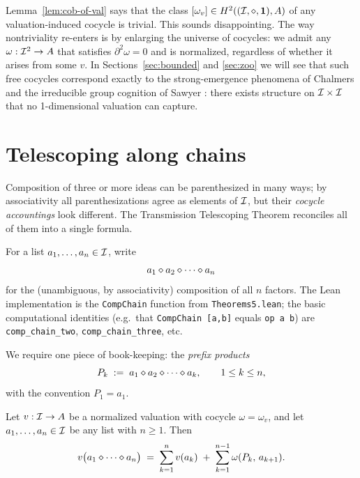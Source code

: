 \begin{remark}\label{rem:class-trivial}
Lemma~\ref{lem:cob-of-val} says that the class $[\omega_v] \in H^2((\mathcal{I},\mathbin{\diamond},\mathbf{1}), A)$
of any valuation-induced cocycle is trivial. This sounds disappointing.
The way nontriviality re-enters is by enlarging the universe of cocycles:
we admit any $\omega : \mathcal{I}^2 \to A$ that satisfies $\partial^2 \omega = 0$
and is normalized, regardless of whether it arises from some $v$. In
Sections~\ref{sec:bounded} and \ref{sec:zoo} we will see that such free
cocycles correspond exactly to the strong-emergence phenomena of Chalmers
\cite{ChalmersStrong} and the irreducible group cognition of Sawyer
\cite{Sawyer2005}: there exists structure on $\mathcal{I}\times\mathcal{I}$ that no
1-dimensional valuation can capture.
\end{remark}

\section{Telescoping along chains}\label{sec:telescope}

Composition of three or more ideas can be parenthesized in many ways; by
associativity all parenthesizations agree as elements of $\mathcal{I}$, but their
\emph{cocycle accountings} look different. The Transmission Telescoping
Theorem reconciles all of them into a single formula.

\begin{notation}\label{not:chain}
For a list $a_1, \dots, a_n \in \mathcal{I}$, write
\[
  a_1 \mathbin{\diamond} a_2 \mathbin{\diamond} \cdots \mathbin{\diamond} a_n
\]
for the (unambiguous, by associativity) composition of all $n$ factors.
The Lean implementation is the \texttt{CompChain} function from
\texttt{Theorems5.lean}; the basic computational identities (e.g.\ that
\texttt{CompChain [a,b]} equals \texttt{op a b}) are
\texttt{comp\_chain\_two}, \texttt{comp\_chain\_three}, etc.
\end{notation}

We require one piece of book-keeping: the \emph{prefix products}
\[
  P_k \;:=\; a_1 \mathbin{\diamond} a_2 \mathbin{\diamond} \cdots \mathbin{\diamond} a_k, \qquad 1\le k\le n,
\]
with the convention $P_1 = a_1$.

\begin{theorem}\label{thm:telescope}
Let $v : \mathcal{I} \to A$ be a normalized valuation with cocycle $\omega =
\omega_v$, and let $a_1,\dots,a_n \in \mathcal{I}$ be any list with $n \ge 1$.
Then
\begin{equation}\label{eq:telescope}
  v\bigl(a_1\mathbin{\diamond}\cdots\mathbin{\diamond} a_n\bigr) \;=\; \sum_{k=1}^n v(a_k)
  \;+\; \sum_{k=1}^{n-1} \omega(P_k,\,a_{k+1}).
\end{equation}
\end{theorem}

